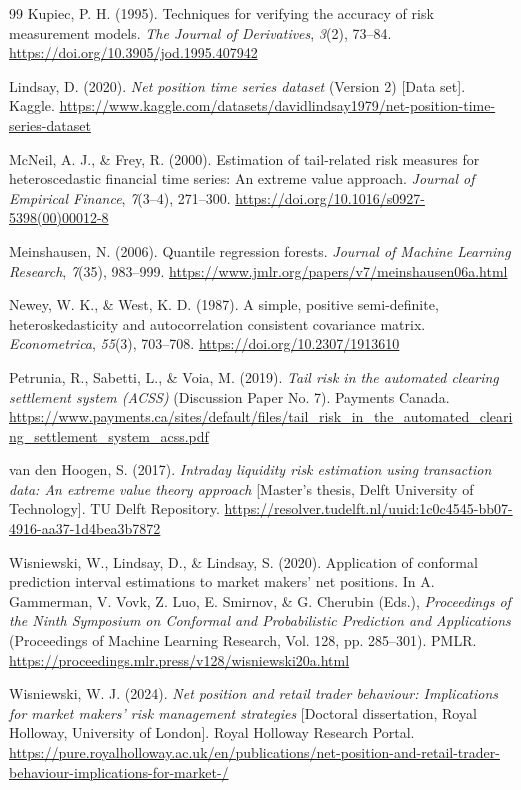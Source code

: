 \documentclass[11pt,a4paper]{article}
\begin{document}
\begin{thebibliography}{99}
 Kupiec, P. H. (1995). Techniques for verifying the accuracy of risk measurement models. \emph{The Journal of Derivatives}, \emph{3}(2), 73--84. \url{https://doi.org/10.3905/jod.1995.407942}

 Lindsay, D. (2020). \emph{Net position time series dataset} (Version 2) [Data set]. Kaggle. \url{https://www.kaggle.com/datasets/davidlindsay1979/net-position-time-series-dataset}

 McNeil, A. J., \& Frey, R. (2000). Estimation of tail-related risk measures for heteroscedastic financial time series: An extreme value approach. \emph{Journal of Empirical Finance}, \emph{7}(3--4), 271--300. \url{https://doi.org/10.1016/s0927-5398(00)00012-8}

 Meinshausen, N. (2006). Quantile regression forests. \emph{Journal of Machine Learning Research}, \emph{7}(35), 983--999. \url{https://www.jmlr.org/papers/v7/meinshausen06a.html}

 Newey, W. K., \& West, K. D. (1987). A simple, positive semi-definite, heteroskedasticity and autocorrelation consistent covariance matrix. \emph{Econometrica}, \emph{55}(3), 703--708. \url{https://doi.org/10.2307/1913610}

 Petrunia, R., Sabetti, L., \& Voia, M. (2019). \emph{Tail risk in the automated clearing settlement system (ACSS)} (Discussion Paper No. 7). Payments Canada. \url{https://www.payments.ca/sites/default/files/tail_risk_in_the_automated_clearing_settlement_system_acss.pdf}

 van den Hoogen, S. (2017). \emph{Intraday liquidity risk estimation using transaction data: An extreme value theory approach} [Master's thesis, Delft University of Technology]. TU Delft Repository. \url{https://resolver.tudelft.nl/uuid:1c0c4545-bb07-4916-aa37-1d4bea3b7872}

 Wisniewski, W., Lindsay, D., \& Lindsay, S. (2020). Application of conformal prediction interval estimations to market makers' net positions. In A. Gammerman, V. Vovk, Z. Luo, E. Smirnov, \& G. Cherubin (Eds.), \emph{Proceedings of the Ninth Symposium on Conformal and Probabilistic Prediction and Applications} (Proceedings of Machine Learning Research, Vol. 128, pp. 285--301). PMLR. \url{https://proceedings.mlr.press/v128/wisniewski20a.html}

 Wisniewski, W. J. (2024). \emph{Net position and retail trader behaviour: Implications for market makers' risk management strategies} [Doctoral dissertation, Royal Holloway, University of London]. Royal Holloway Research Portal. \url{https://pure.royalholloway.ac.uk/en/publications/net-position-and-retail-trader-behaviour-implications-for-market-/}
\end{thebibliography}
\end{document}
